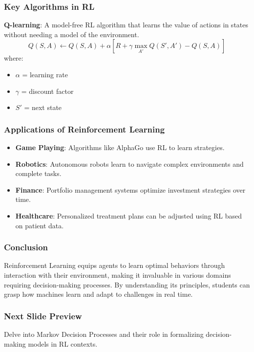 \documentclass[aspectratio=169]{beamer}
\begin{document}
\begin{frame}[fragile]
    \frametitle{Key Algorithms in RL}
    \textbf{Q-learning}: A model-free RL algorithm that learns the value of actions in states without needing a model of the environment.
    \begin{equation}
        Q(S, A) \leftarrow Q(S, A) + \alpha \left[R + \gamma \max_{A'} Q(S', A') - Q(S, A)\right]
    \end{equation}
    where:
    \begin{itemize}
        \item $\alpha$ = learning rate
        \item $\gamma$ = discount factor
        \item $S'$ = next state
    \end{itemize}
\end{frame}

\begin{frame}[fragile]
    \frametitle{Applications of Reinforcement Learning}
    \begin{itemize}
        \item \textbf{Game Playing}: Algorithms like AlphaGo use RL to learn strategies.
        \item \textbf{Robotics}: Autonomous robots learn to navigate complex environments and complete tasks.
        \item \textbf{Finance}: Portfolio management systems optimize investment strategies over time.
        \item \textbf{Healthcare}: Personalized treatment plans can be adjusted using RL based on patient data.
    \end{itemize}
\end{frame}

\begin{frame}[fragile]
    \frametitle{Conclusion}
    Reinforcement Learning equips agents to learn optimal behaviors through interaction with their environment, making it invaluable in various domains requiring decision-making processes. By understanding its principles, students can grasp how machines learn and adapt to challenges in real time.
\end{frame}

\begin{frame}[fragile]
    \frametitle{Next Slide Preview}
    Delve into Markov Decision Processes and their role in formalizing decision-making models in RL contexts.
\end{frame}
\end{document}
